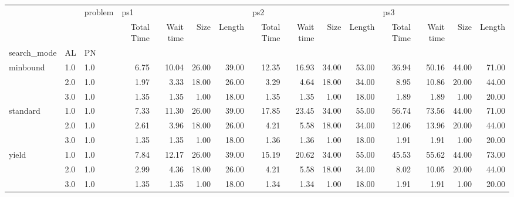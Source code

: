 \begin{tabular}{lllrrrrrrrrrrrr}
\toprule
      &     & problem & \multicolumn{4}{l}{ps1} & \multicolumn{4}{l}{ps2} & \multicolumn{4}{l}{ps3} \\
      &     & {} & Total Time & Wait time &  Size & Length & Total Time & Wait time &  Size & Length & Total Time & Wait time &  Size & Length \\
search\_mode & AL & PN &            &           &       &        &            &           &       &        &            &           &       &        \\
\midrule
minbound & 1.0 & 1.0 &       6.75 &     10.04 & 26.00 &  39.00 &      12.35 &     16.93 & 34.00 &  53.00 &      36.94 &     50.16 & 44.00 &  71.00 \\
      & 2.0 & 1.0 &       1.97 &      3.33 & 18.00 &  26.00 &       3.29 &      4.64 & 18.00 &  34.00 &       8.95 &     10.86 & 20.00 &  44.00 \\
      & 3.0 & 1.0 &       1.35 &      1.35 &  1.00 &  18.00 &       1.35 &      1.35 &  1.00 &  18.00 &       1.89 &      1.89 &  1.00 &  20.00 \\
standard & 1.0 & 1.0 &       7.33 &     11.30 & 26.00 &  39.00 &      17.85 &     23.45 & 34.00 &  55.00 &      56.74 &     73.56 & 44.00 &  71.00 \\
      & 2.0 & 1.0 &       2.61 &      3.96 & 18.00 &  26.00 &       4.21 &      5.58 & 18.00 &  34.00 &      12.06 &     13.96 & 20.00 &  44.00 \\
      & 3.0 & 1.0 &       1.35 &      1.35 &  1.00 &  18.00 &       1.36 &      1.36 &  1.00 &  18.00 &       1.91 &      1.91 &  1.00 &  20.00 \\
yield & 1.0 & 1.0 &       7.84 &     12.17 & 26.00 &  39.00 &      15.19 &     20.62 & 34.00 &  55.00 &      45.53 &     55.62 & 44.00 &  73.00 \\
      & 2.0 & 1.0 &       2.99 &      4.36 & 18.00 &  26.00 &       4.21 &      5.58 & 18.00 &  34.00 &       8.02 &     10.05 & 20.00 &  44.00 \\
      & 3.0 & 1.0 &       1.35 &      1.35 &  1.00 &  18.00 &       1.34 &      1.34 &  1.00 &  18.00 &       1.91 &      1.91 &  1.00 &  20.00 \\
\bottomrule
\end{tabular}
